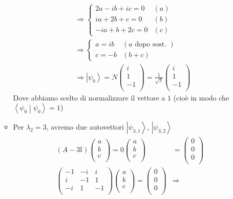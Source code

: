 \documentclass[../../FisicaTeorica.tex]{subfiles}
\begin{document}
\begin{enumerate}
\begin{itemize}
\begin{align*}
	&\Rightarrow
	\begin{cases}
	2a-ib+ic=0 & (a)\\
	ia+2b+c=0 & (b)\\
	-ia+b+2c=0 & (c)
	\end{cases}\\
	&\Rightarrow 
	\begin{cases}
	a=ib & (a \text{ dopo sost. })\\
	c=-b & (b+c)
	\end{cases}\\
	&\Rightarrow \left|\psi_0\right\rangle=N\left(\begin{matrix}i\\1\\-1\\\end{matrix}\right)=\frac{1}{\sqrt3}\left(\begin{matrix}i\\1\\-1\\\end{matrix}\right)
	\end{align*}
	Dove abbiamo scelto di normalizzare il vettore a $1$ (cioè in modo che  $\left\langle\psi_0\middle|\psi_0\right\rangle=1$)
	\item Per $\lambda_2=3$, avremo due autovettori $\left|\psi_{3,1}\right\rangle$, $\left|\psi_{3,2}\right\rangle$
	\begin{align*}
	\left(A-3\mathbb{I}\right)\left(\begin{matrix}a\\b\\c\\\end{matrix}\right)=0\left(\begin{matrix}a\\b\\c\\\end{matrix}\right)&=\left(\begin{matrix}0\\0\\0\\\end{matrix}\right)\\
	\left(\begin{matrix}-1&-i&i\\i&-1&1\\-i&1&-1\\\end{matrix}\right)\left(\begin{matrix}a\\b\\c\\\end{matrix}\right)=\left(\begin{matrix}0\\0\\0\\\end{matrix}\right)& \Rightarrow 

\end{align*}
\end{itemize}
\end{enumerate}
\end{document}
